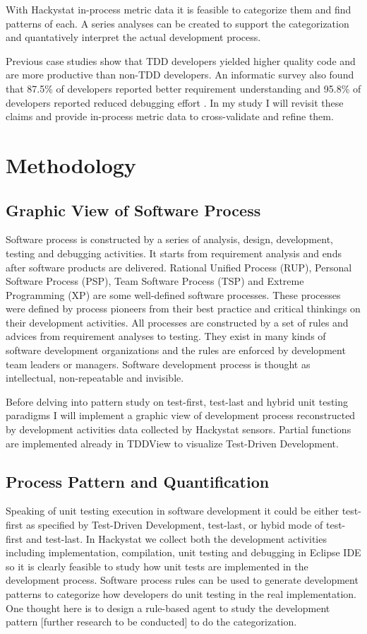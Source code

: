 \documentclass[11pt,twocolumn]{article}
\begin{document}
With Hackystat in-process metric data it is feasible to categorize them and
find patterns of each. A series analyses can be created to support the
categorization and quantatively interpret the actual development process.

Previous case studies show that TDD developers yielded higher quality code
and are more productive than non-TDD developers.  An informatic survey also
found that 87.5\% of developers reported better requirement understanding
and 95.8\% of developers reported reduced debugging effort
\cite{HawleyBlog}. In my study I will revisit these claims and provide
in-process metric data to cross-validate and refine them.

\section{Methodology}
\label{sec:method}

\subsection{Graphic View of Software Process}
Software process is constructed by a series of analysis, design,
development, testing and debugging activities. It starts from requirement
analysis and ends after software products are delivered. Rational Unified
Process (RUP), Personal Software Process (PSP), Team Software Process (TSP)
and Extreme Programming (XP) are some well-defined software processes.
These processes were defined by process pioneers from their best practice
and critical thinkings on their development activities. All processes are
constructed by a set of rules and advices from requirement analyses to
testing. They exist in many kinds of software development organizations and
the rules are enforced by development team leaders or managers. Software
development process is thought as intellectual, non-repeatable and invisible.

Before delving into pattern study on test-first, test-last and hybrid unit
testing paradigms I will implement a graphic view of development process
reconstructed by development activities data collected by Hackystat
sensors. Partial functions are implemented already in TDDView to visualize
Test-Driven Development.

\subsection{Process Pattern and Quantification}
Speaking of unit testing execution in software development it could be
either test-first as specified by Test-Driven Development, test-last, or
hybid mode of test-first and test-last. In Hackystat we collect both the
development activities including implementation, compilation, unit testing
and debugging in Eclipse IDE so it is clearly feasible to study how unit
tests are implemented in the development process. Software process rules
can be used to generate development patterns to categorize how developers
do unit testing in the real implementation. One thought here is to design a
rule-based agent to study the development pattern [further research to be
conducted] to do the categorization.
\end{document}
